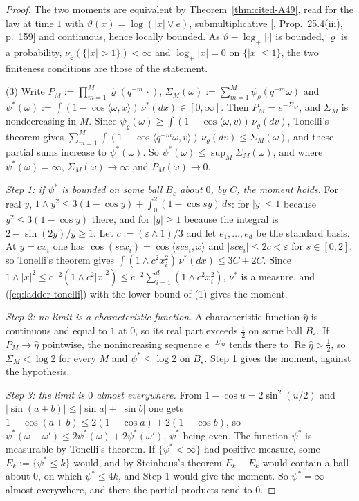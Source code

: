 \begin{proof}
The two moments are equivalent by Theorem~\ref{thm:cited-A49}, read for the law at time $1$ with
$\vartheta(x) = \log(|x| \vee e)$, submultiplicative [, Prop.~25.4(iii),
p.~159] and continuous, hence locally bounded. As $\vartheta - \log_+|\cdot|$ is bounded, $\varrho$ is
a probability, $\nu_\varrho(\{|x| > 1\}) < \infty$ and $\log_+|x| = 0$ on $\{|x| \le 1\}$, the two
finiteness conditions are those of the statement.

(3) Write $P_M := \prod_{m=1}^M\widehat\varrho(q^{-m}\,\cdot)$,
$\Sigma_M(\omega) := \sum_{m=1}^M\psi_\varrho(q^{-m}\omega)$ and
$\psi^*(\omega) := \int(1 - \cos\langle\omega, x\rangle)\,\nu^*(dx) \in [0, \infty]$. Then
$P_M = e^{-\Sigma_M}$, and $\Sigma_M$ is nondecreasing in $M$. Since
$\psi_\varrho(\omega) \ge \int(1 - \cos\langle\omega, v\rangle)\,\nu_\varrho(dv)$, Tonelli's theorem gives
$\sum_{m=1}^M\int(1 - \cos\langle q^{-m}\omega, v\rangle)\,\nu_\varrho(dv) \le \Sigma_M(\omega)$, and these
partial sums increase to $\psi^*(\omega)$. So $\psi^*(\omega) \le \sup_M\Sigma_M(\omega)$, and where
$\psi^*(\omega) = \infty$, $\Sigma_M(\omega) \to \infty$ and $P_M(\omega) \to 0$.

\emph{Step 1: if $\psi^*$ is bounded on some ball $B_\varepsilon$ about $0$, by $C$, the moment
holds.} For real $y$, $1 \wedge y^2 \le 3(1 - \cos y) + \int_0^2(1 - \cos sy)\,ds$: for $|y| \le 1$
because $y^2 \le 3(1 - \cos y)$ there, and for $|y| \ge 1$ because the integral is
$2 - \sin(2y)/y \ge 1$. Let $c := (\varepsilon \wedge 1)/3$ and let $e_1, \dots, e_d$ be the standard
basis. At $y = cx_i$ one has $\cos(scx_i) = \cos\langle sce_i, x\rangle$ and $|sce_i| \le 2c < \varepsilon$
for $s \in [0, 2]$, so Tonelli's theorem gives
$\int(1 \wedge c^2x_i^2)\,\nu^*(dx) \le 3C + 2C$. Since
$1 \wedge |x|^2 \le c^{-2}(1 \wedge c^2|x|^2) \le c^{-2}\sum_{i=1}^d(1 \wedge c^2x_i^2)$, $\nu^*$ is a
\Levy{} measure, and (\ref{eq:ladder-tonelli}) with the lower bound of (1) gives the moment.

\emph{Step 2: no limit is a characteristic function.} A characteristic function $\widehat\eta$ is
continuous and equal to $1$ at $0$, so its real part exceeds $\tfrac12$ on some ball $B_\varepsilon$.
If $P_M \to \widehat\eta$ pointwise, the nonincreasing sequence $e^{-\Sigma_M}$ tends there to
$\operatorname{Re}\widehat\eta > \tfrac12$, so $\Sigma_M < \log 2$ for every $M$ and
$\psi^* \le \log 2$ on $B_\varepsilon$. Step 1 gives the moment, against the hypothesis.

\emph{Step 3: the limit is $0$ almost everywhere.} From $1 - \cos u = 2\sin^2(u/2)$ and
$|\sin(a + b)| \le |\sin a| + |\sin b|$ one gets $1 - \cos(a + b) \le 2(1 - \cos a) + 2(1 - \cos b)$,
so $\psi^*(\omega - \omega') \le 2\psi^*(\omega) + 2\psi^*(\omega')$, $\psi^*$ being even. The
function $\psi^*$ is measurable by Tonelli's theorem. If $\{\psi^* < \infty\}$ had positive measure,
some $E_k := \{\psi^* \le k\}$ would, and by Steinhaus's theorem $E_k - E_k$ would contain a ball
about $0$, on which $\psi^* \le 4k$, and Step 1 would give the moment. So $\psi^* = \infty$ almost
everywhere, and there the partial products tend to $0$.


\end{proof}
